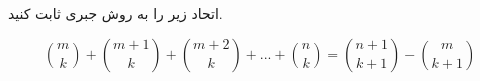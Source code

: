 \EXERCISE
اتحاد زیر را به روش جبری ثابت کنید.

$$\binom{m}{k} + \binom{m+1}{k} + \binom{m+2}{k} + ... + \binom{n}{k} = \binom{n+1}{k+1} - \binom{m}{k+1}$$